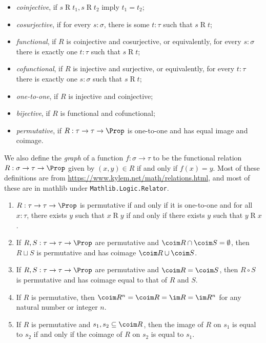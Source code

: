 \begin{definition}
\begin{itemize}
    \item \emph{coinjective}, if \( s \mathrel{R} t_1, s \mathrel{R} t_2 \) imply \( t_1 = t_2 \);
    \item \emph{cosurjective}, if for every \( s : \sigma \), there is some \( t : \tau \) such that \( s \mathrel{R} t \);
    \item \emph{functional}, if \( R \) is coinjective and cosurjective, or equivalently, for every \( s : \sigma \) there is exactly one \( t : \tau \) such that \( s \mathrel{R} t \);
    \item \emph{cofunctional}, if \( R \) is injective and surjective, or equivalently, for every \( t : \tau \) there is exactly one \( s : \sigma \) such that \( s \mathrel{R} t \);
    \item \emph{one-to-one}, if \( R \) is injective and coinjective;
    \item \emph{bijective}, if \( R \) is functional and cofunctional;
    \item \emph{permutative}, if \( R : \tau \to \tau \to \Prop \) is one-to-one and has equal image and coimage.
  \end{itemize}
  We also define the \emph{graph} of a function \( f : \sigma \to \tau \) to be the functional relation \( R : \sigma \to \tau \to \Prop \) given by \( (x, y) \in R \) if and only if \( f(x) = y \).
  Most of these definitions are from \url{https://www.kylem.net/math/relations.html}, and most of these are in mathlib under \texttt{Mathlib.Logic.Relator}.
\end{definition}
\begin{proposition}\mbox\negthinspace
  \label{prop:relation_results}
  \begin{enumerate}
    \item \( R : \tau \to \tau \to \Prop \) is permutative if and only if it is one-to-one and for all \( x : \tau \), there exists \( y \) such that \( x \mathrel{R} y \) if and only if there exists \( y \) such that \( y \mathrel{R} x \).
    \item If \( R, S : \tau \to \tau \to \Prop \) are permutative and \( \coim R \cap \coim S = \emptyset \), then \( R \sqcup S \) is permutative and has coimage \( \coim R \cup \coim S \).
    \item If \( R, S : \tau \to \tau \to \Prop \) are permutative and \( \coim R = \coim S \), then \( R \circ S \) is permutative and has coimage equal to that of \( R \) and \( S \).
    \item If \( R \) is permutative, then \( \coim R^n = \coim R = \im R = \im R^n \) for any natural number or integer \( n \).
    \item If \( R \) is permutative and \( s_1, s_2 \subseteq \coim R \), then the image of \( R \) on \( s_1 \) is equal to \( s_2 \) if and only if the coimage of \( R \) on \( s_2 \) is equal to \( s_1 \).
  \end{enumerate}
\end{proposition}
